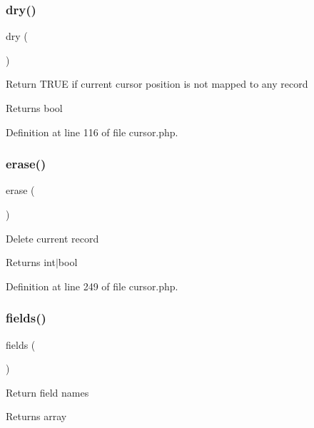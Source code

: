 \subsubsection{\texorpdfstring{dry()}{dry()}}
{\footnotesize\ttfamily dry (\begin{DoxyParamCaption}{ }\end{DoxyParamCaption})}

Return T\+R\+UE if current cursor position is not mapped to any record \begin{DoxyReturn}{Returns}
bool 
\end{DoxyReturn}


Definition at line 116 of file cursor.\+php.

\hypertarget{class_d_b_1_1_cursor_a933f3fa1037c8b797bdd237d811edf82}{}\label{class_d_b_1_1_cursor_a933f3fa1037c8b797bdd237d811edf82} 
\subsubsection{\texorpdfstring{erase()}{erase()}}
{\footnotesize\ttfamily erase (\begin{DoxyParamCaption}{ }\end{DoxyParamCaption})}

Delete current record \begin{DoxyReturn}{Returns}
int$\vert$bool 
\end{DoxyReturn}


Definition at line 249 of file cursor.\+php.

\hypertarget{class_d_b_1_1_cursor_a9dfc1601eaf8348bed6ba5622f725971}{}\label{class_d_b_1_1_cursor_a9dfc1601eaf8348bed6ba5622f725971} 
\subsubsection{\texorpdfstring{fields()}{fields()}}
{\footnotesize\ttfamily fields (\begin{DoxyParamCaption}{ }\end{DoxyParamCaption})\hspace{0.3cm}{\ttfamily [abstract]}}

Return field names \begin{DoxyReturn}{Returns}
array 
\end{DoxyReturn}
\hypertarget{class_d_b_1_1_cursor_a45e70f55799839fc0286bc94000924a7}{}\label{class_d_b_1_1_cursor_a45e70f55799839fc0286bc94000924a7} 
